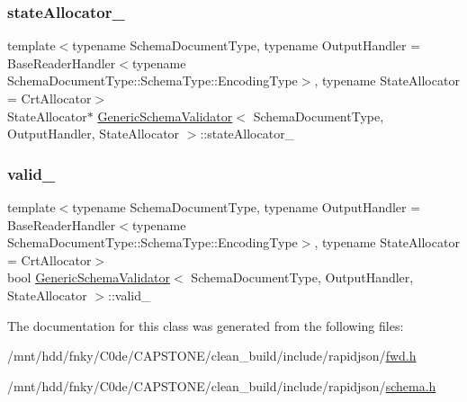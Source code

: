 \subsubsection{\texorpdfstring{state\+Allocator\+\_\+}{stateAllocator\_}}
{\footnotesize\ttfamily template$<$typename Schema\+Document\+Type, typename Output\+Handler = Base\+Reader\+Handler$<$typename Schema\+Document\+Type\+::\+Schema\+Type\+::\+Encoding\+Type$>$, typename State\+Allocator = Crt\+Allocator$>$ \\
State\+Allocator$\ast$ \hyperlink{classGenericSchemaValidator}{Generic\+Schema\+Validator}$<$ Schema\+Document\+Type, Output\+Handler, State\+Allocator $>$\+::state\+Allocator\+\_\+\hspace{0.3cm}{\ttfamily [private]}}

\mbox{\label{classGenericSchemaValidator_a637361bc6c37c60278576169f01c84bb}} 
\subsubsection{\texorpdfstring{valid\+\_\+}{valid\_}}
{\footnotesize\ttfamily template$<$typename Schema\+Document\+Type, typename Output\+Handler = Base\+Reader\+Handler$<$typename Schema\+Document\+Type\+::\+Schema\+Type\+::\+Encoding\+Type$>$, typename State\+Allocator = Crt\+Allocator$>$ \\
bool \hyperlink{classGenericSchemaValidator}{Generic\+Schema\+Validator}$<$ Schema\+Document\+Type, Output\+Handler, State\+Allocator $>$\+::valid\+\_\+\hspace{0.3cm}{\ttfamily [private]}}



The documentation for this class was generated from the following files\+:\begin{DoxyCompactItemize}
\item 
/mnt/hdd/fnky/\+C0de/\+C\+A\+P\+S\+T\+O\+N\+E/clean\+\_\+build/include/rapidjson/\hyperlink{fwd_8h}{fwd.\+h}\item 
/mnt/hdd/fnky/\+C0de/\+C\+A\+P\+S\+T\+O\+N\+E/clean\+\_\+build/include/rapidjson/\hyperlink{schema_8h}{schema.\+h}\end{DoxyCompactItemize}
